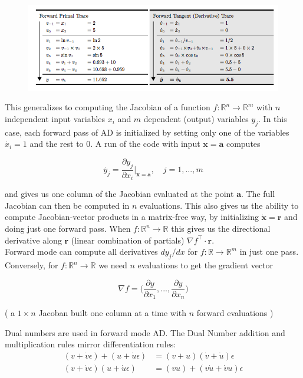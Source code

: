 \documentclass[11pt]{article}
\theoremstyle{definition}
\theoremstyle{plain}
\renewcommand{\v}[1]{\mathbf{#1}}
\renewcommand{\b}[1]{\mathbb{#1}}
\begin{document}
\begin{figure}[H]
\includegraphics[width=12cm]{forward_dual}
\centering
\end{figure}


\noindent 
This generalizes to computing the Jacobian of a function $f: \b{R}^n \rightarrow \b{R}^m$
with $n$ independent input variables $x_i$ and $m$ dependent (output) variables $y_j$.
In this case, each forward pass of AD is initialized by setting only one of the variables
$\dot{x_i}=1$ and the rest to $0$. A run of the code with input $\v{x}=\v{a}$ computes

        $$ \dot{y_j} = \frac{\partial y_j}{\partial x_i} \rvert_{\v{x}=\v{a}}, 
            \quad j=1,...,m $$

\noindent and gives us one column of the Jacobian evaluated at the point $\v{a}$. The full
Jacobian can then be computed in $n$ evaluations. 
This also gives us the ability to compute Jacobian-vector products in a matrix-free way,
by initializing $\dot{\v{x}}=\v{r}$ and doing just one forward pass. When $f:\b{R}^n \rightarrow
\b{R}$ this gives us the directional derivative along $\v{r}$ (linear combination of partials)
$\nabla f^\top \cdot \v{r}$.\\

\noindent Forward mode can compute all derivatives $d y_j / dx$ for $f: \b{R} \rightarrow \b{R}^m$ in just one pass. Conversely, for $f: \b{R}^n \rightarrow \b{R}$ we need $n$ evaluations
to get the gradient vector

$$ \nabla f = \Big( \frac{\partial y}{\partial x_1},...,\frac{\partial y}{\partial x_n} \Big )$$

\noindent( a $1 \times n$ Jacoban built one column at a time with $n$ forward evaluations )

\noindent Dual numbers are used in forward mode AD. The Dual Number addition
and multiplication rules mirror differentiation rules:
\begin{align*}
    (v + \dot{v} \epsilon) + (u + \dot{u} \epsilon) &= (v+u) (\dot{v}+\dot{u})\epsilon\\
    (v + \dot{v} \epsilon)(u + \dot{u}\epsilon) &= (vu) + (v \dot{u} + \dot{v} u )\epsilon
\end{align*}
\end{document}
